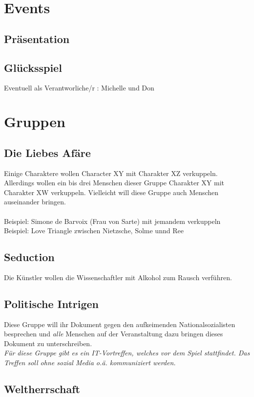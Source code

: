 \documentclass[12pt, a4paper, openany]{report}
\begin{document}


\chapter{Events}
\section{Präsentation}
\section{Glücksspiel}
Eventuell als Verantworliche/r : Michelle und Don

\chapter{Gruppen}
\section{Die Liebes Afäre}
Einige Charaktere wollen Character XY mit Charakter XZ verkuppeln.
Allerdings wollen ein bis drei Menschen dieser Gruppe Charakter XY mit Charakter XW verkuppeln.
Vielleicht will diese Gruppe auch Menschen auseinander bringen.\\\\
Beispiel: Simone de Barvoix (Frau von Sarte) mit jemandem verkuppeln\\
Beispiel: Love Triangle zwischen Nietzsche, Solme unnd Ree

\section{Seduction}
Die Künstler wollen die Wissenschaftler mit Alkohol zum Rausch verführen. 

\section{Politische Intrigen}
Diese Gruppe will ihr Dokument gegen den aufkeimenden Nationalsozialisten besprechen und \emph{alle} Menschen auf der Veranstaltung dazu bringen dieses Dokument zu unterschreiben.\\

\emph{Für diese Gruppe gibt es ein IT-Vortreffen, welches vor dem Spiel stattfindet.
Das Treffen soll ohne sozial Media o.ä. kommuniziert werden.}

\section{Weltherrschaft}
\end{document}
